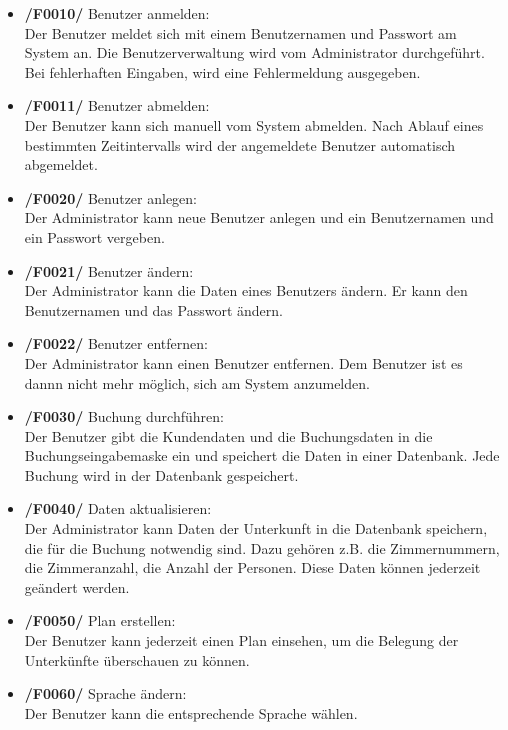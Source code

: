 \documentclass[a4paper,oneside,10pt]{scrreprt}
\begin{document}
\begin{itemize}
\item \textbf{/F0010/} Benutzer anmelden:  \\
Der Benutzer meldet sich mit einem Benutzernamen und Passwort am System an. Die Benutzerverwaltung wird vom Administrator durchgeführt. Bei fehlerhaften Eingaben, wird eine Fehlermeldung ausgegeben.

\item \textbf{/F0011/} Benutzer abmelden: \\
Der Benutzer kann sich manuell vom System abmelden. Nach Ablauf eines bestimmten Zeitintervalls wird der angemeldete Benutzer automatisch abgemeldet. 

\item \textbf{/F0020/} Benutzer anlegen:  \\
Der Administrator kann neue Benutzer anlegen und ein Benutzernamen und ein Passwort vergeben.

\item \textbf{/F0021/} Benutzer ändern: \\
Der Administrator kann die Daten eines Benutzers ändern. Er kann den Benutzernamen und das Passwort ändern.

\item \textbf{/F0022/} Benutzer entfernen: \\
Der Administrator kann einen Benutzer entfernen. Dem Benutzer ist es dannn nicht mehr möglich, sich am System anzumelden.
 
\item \textbf{/F0030/} Buchung durchführen: \\
Der Benutzer gibt die Kundendaten und die Buchungsdaten in die Buchungseingabemaske ein und speichert die Daten in einer Datenbank. Jede Buchung wird in der Datenbank gespeichert.

\item \textbf{/F0040/} Daten aktualisieren:  \\
Der Administrator kann Daten der Unterkunft in die Datenbank speichern, die für die Buchung notwendig sind. Dazu gehören z.B. die Zimmernummern, die Zimmeranzahl, die Anzahl der Personen. Diese Daten können jederzeit geändert werden.

\item \textbf{/F0050/} Plan erstellen:  \\
Der Benutzer kann jederzeit einen Plan einsehen, um die Belegung der Unterkünfte überschauen zu können.

\item \textbf{/F0060/} Sprache ändern:  \\
Der Benutzer kann die entsprechende Sprache wählen.
\end{itemize}
\end{document}
